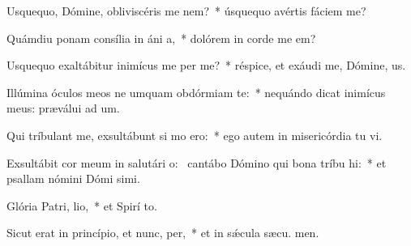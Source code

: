 \item Usquequo, Dómine, obliviscéris me  nem?~* úsquequo avértis fáciem   me?
\item Quámdiu ponam consília in áni a,~* dolórem in corde me  em?
\item Usquequo exaltábitur inimícus me per me?~* réspice, et exáudi me, Dómine,  us.
\item Illúmina óculos meos ne umquam obdórmiam  te:~* nequándo dicat inimícus meus: præválui ad um.
\item Qui tríbulant me, exsultábunt si mo ero:~* ego autem in misericórdia tu vi.
\item Exsultábit cor meum in salutári o:~\pscross{} cantábo Dómino qui bona tríbu hi:~* et psallam nómini Dómi simi.
\item Glória Patri,  lio,~* et Spirí to.
\item Sicut erat in princípio, et nunc,  per,~* et in sǽcula sæcu. men.
